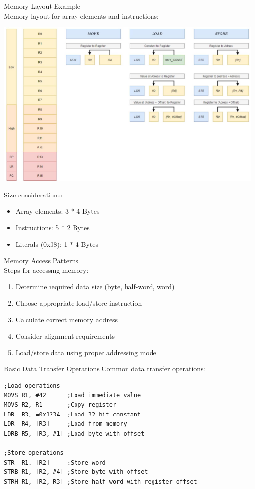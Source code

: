 \begin{example2}{Memory Layout Example}\\
Memory layout for array elements and instructions:

\includegraphics[width=\linewidth]{images/2024_12_29_79e6b22f503fb7b4f718g-03}
\end{example2}
\begin{remark}
Size considerations:
\begin{itemize}
  \item Array elements: 3 * 4 Bytes
  \item Instructions: 5 * 2 Bytes
  \item Literals (0x08): 1 * 4 Bytes
\end{itemize}
\end{remark}

\begin{KR}{Memory Access Patterns}\\
Steps for accessing memory:
\begin{enumerate}
  \item Determine required data size (byte, half-word, word)
  \item Choose appropriate load/store instruction
  \item Calculate correct memory address
  \item Consider alignment requirements
  \item Load/store data using proper addressing mode
\end{enumerate}
\end{KR}

\begin{example2}{Basic Data Transfer Operations}
Common data transfer operations:
\begin{lstlisting}[language=armasm, style=basesmol]
;Load operations
MOVS R1, #42      ;Load immediate value
MOVS R2, R1       ;Copy register
LDR  R3, =0x1234  ;Load 32-bit constant
LDR  R4, [R3]     ;Load from memory
LDRB R5, [R3, #1] ;Load byte with offset

;Store operations
STR  R1, [R2]     ;Store word
STRB R1, [R2, #4] ;Store byte with offset
STRH R1, [R2, R3] ;Store half-word with register offset
\end{lstlisting}
\end{example2}

